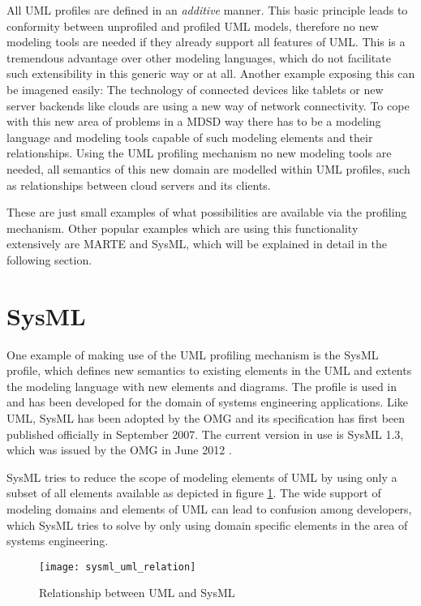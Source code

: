 All \ac{UML} profiles are defined in an \textit{additive} manner. This basic
principle leads to conformity between unprofiled and profiled \ac{UML} models, therefore no new modeling tools are
needed if they already support all features of \ac{UML}. This is a tremendous
advantage over other modeling languages, which do not facilitate such
extensibility in this generic way or at all. Another example exposing this can
be imagened easily:
The technology of connected devices like tablets or new server backends like clouds are using a
new way of network connectivity. To cope with this new area of problems in a
\ac{MDSD} way there has to be a modeling language and modeling tools capable of
such modeling elements and their relationships. Using the \ac{UML} profiling
mechanism no new modeling tools are needed, all semantics of this new domain
are modelled within \ac{UML} profiles, such as relationships between cloud
servers and its clients.

These are just small examples of what possibilities are available via the
profiling mechanism. Other popular examples which are using this functionality extensively are \ac{MARTE} and \ac{SysML}, which will be explained in detail in the
following section.
\section{SysML}\label{environment_and_tools:sysml}
One example of making use of the \ac{UML} profiling mechanism is the \ac{SysML}
profile, which defines new semantics to existing elements in the \ac{UML} and
extents the modeling language with new elements and diagrams. The profile is
used in  and has been developed for the domain of systems engineering applications.
Like \ac{UML}, \ac{SysML} has been adopted by the \ac{OMG} and its specification
has first been published officially in September 2007\cite{Wik13_3}. The current
version in use is \ac{SysML} 1.3, which was issued by the \ac{OMG} in June 2012
\cite{OMGSysMLSpecification}.

\ac{SysML} tries to reduce the scope of modeling elements of \ac{UML} by using
only a subset of all elements available as depicted in figure
\ref{sysml_uml_relation}. The wide support of modeling domains and elements of
\ac{UML} can lead to confusion among developers, which \ac{SysML} tries to solve
by only using domain specific elements in the area of systems engineering.

\begin{figure}%
\begin{center}
\texttt{[image: sysml\_uml\_relation]}\\
\end{center}
\caption{Relationship between \ac{UML} and \ac{SysML}~\cite{OMGSysML}}
\label{sysml_uml_relation}
\end{figure}


